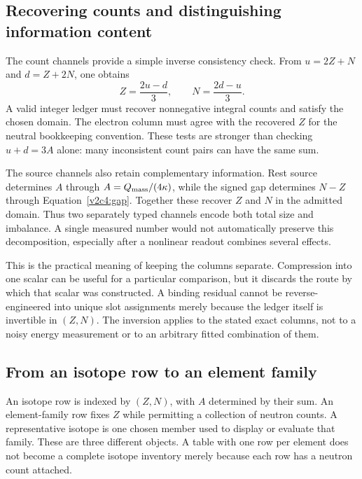 \subsection{Recovering counts and distinguishing information content}
\label{v2c4:inverse}

The count channels provide a simple inverse consistency check. From $u=2Z+N$ and $d=Z+2N$, one obtains
\begin{equation}
 Z=\frac{2u-d}{3},\qquad
 N=\frac{2d-u}{3}.
 \label{v2c4:inversecounts}
\end{equation}
A valid integer ledger must recover nonnegative integral counts and satisfy the chosen domain. The electron column must agree with the recovered $Z$ for the neutral bookkeeping convention. These tests are stronger than checking $u+d=3A$ alone: many inconsistent count pairs can have the same sum.

The source channels also retain complementary information. Rest source determines $A$ through $A=Q_{\rm mass}/(4\kappa)$, while the signed gap determines $N-Z$ through Equation~\eqref{v2c4:gap}. Together these recover $Z$ and $N$ in the admitted domain. Thus two separately typed channels encode both total size and imbalance. A single measured number would not automatically preserve this decomposition, especially after a nonlinear readout combines several effects.

This is the practical meaning of keeping the columns separate. Compression into one scalar can be useful for a particular comparison, but it discards the route by which that scalar was constructed. A binding residual cannot be reverse-engineered into unique slot assignments merely because the ledger itself is invertible in $(Z,N)$. The inversion applies to the stated exact columns, not to a noisy energy measurement or to an arbitrary fitted combination of them.

\subsection{From an isotope row to an element family}
\label{v2c4:isotopes}

An isotope row is indexed by $(Z,N)$, with $A$ determined by their sum. An element-family row fixes $Z$ while permitting a collection of neutron counts. A representative isotope is one chosen member used to display or evaluate that family. These are three different objects. A table with one row per element does not become a complete isotope inventory merely because each row has a neutron count attached.


